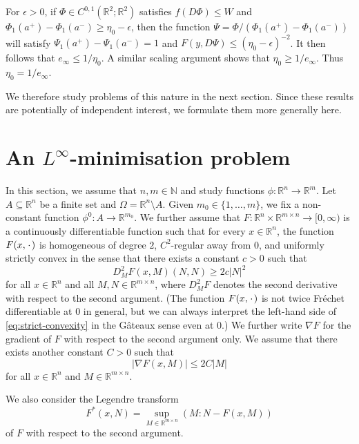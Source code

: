 \documentclass[a4paper]{article}
\newcommand{\R}{\mathbb{R}}
\newcommand{\N}{\mathbb{N}}
\newcommand{\grad}{\nabla}
\newcommand{\blank}{{\mkern 2mu\cdot\mkern 2mu}}
\theoremstyle{definition}
\theoremstyle{remark}
\begin{document}
For $\epsilon > 0$, if $\Phi \in C^{0, 1}(\R^2; \R^2)$ satisfies $f(D\Phi) \le W$ and $\Phi_1(a^+) - \Phi_1(a^-) \ge \eta_0 - \epsilon$, then the function
$\Psi = \Phi/(\Phi_1(a^+) - \Phi_1(a^-))$ will satisfy $\Psi_1(a^+) - \Psi_1(a^-) = 1$ and $F(y, D\Psi) \le (\eta_0 - \epsilon)^{-2}$.
It then follows that $e_\infty \le 1/\eta_0$. A similar scaling argument shows that $\eta_0 \ge 1/e_\infty$.
Thus $\eta_0 = 1/e_\infty$.

We therefore study problems of this nature in the next section.
Since these results are potentially of independent interest, we formulate them
more generally here.







\section{An $L^\infty$-minimisation problem} \label{sct:L-infinity}

In this section, we assume that $n, m \in \N$ and study functions
$\phi \colon \R^n \to \R^m$. Let $A \subseteq \R^n$ be a finite set
and $\Omega = \R^n \setminus A$. Given $m_0 \in \{1, \dotsc, m\}$, we
fix a non-constant function $\phi^0 \colon A \to \R^{m_0}$.
We further assume that $F \colon \R^n \times \R^{m \times n} \to [0, \infty)$
is a continuously differentiable function such that for every $x \in \R^n$, the function
$F(x, \blank)$ is homogeneous of degree $2$, $C^2$-regular away from $0$,
and uniformly strictly convex in the sense that there exists a constant
$c > 0$ such that
\begin{equation} \label{eq:strict-convexity}
D_M^2 F(x, M)(N, N) \ge 2c|N|^2
\end{equation}
for all $x \in \R^n$ and all $M, N \in \R^{m \times n}$, where $D_M^2F$
denotes the second derivative with respect to the second argument.
(The function $F(x, \blank)$ is not twice Fr\'echet differentiable at $0$
in general, but we can always interpret the left-hand side of
\eqref{eq:strict-convexity} in the G\^ateaux sense even at $0$.)
We further write $\grad F$ for the gradient of
$F$ with respect to the second argument only. We assume that there exists
another constant $C > 0$ such that
\begin{equation} \label{eq:uniformly-bounded}
|\grad F(x, M)| \le 2C|M|
\end{equation}
for all $x \in \R^n$ and $M \in \R^{m \times n}$.

We also consider the Legendre transform
\[
F^*(x, N) = \sup_{M \in \R^{m \times n}} (M : N - F(x, M))
\]
of $F$ with respect to the second argument.
\end{document}
